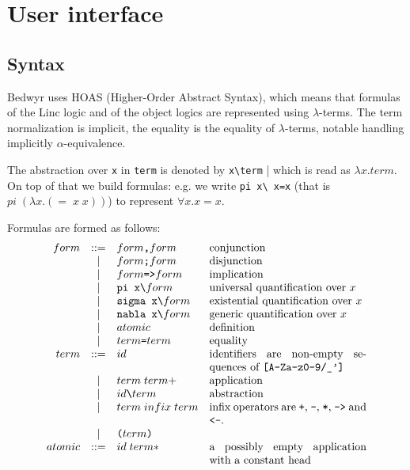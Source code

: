 \documentclass{article}
\begin{document}
\section{User interface}
\label{sec:interface}

\subsection{Syntax}

Bedwyr uses HOAS (Higher-Order Abstract Syntax), which means that formulas
of the Linc logic and of the object logics are represented using 
$\lambda$-terms. The term normalization is implicit, the equality is the 
equality of $\lambda$-terms, notable handling implicitly $\alpha$-equivalence.

The abstraction over \verb.x. in \verb.term. is denoted by \verb.x\term. | 
which is read as $\lambda x. term$. On top of that we build 
formulas: e.g. we write \verb.pi x\ x=x.
(that is $pi\;(\lambda{}x.(=\;x\;x))$)
to represent $\forall x. x=x$.

Formulas are formed as follows:
\[\begin{array}{rclp{5cm}}
form &::=& form \texttt{,}  form & conjunction \\
     & | & form \texttt{;}  form & disjunction \\
     & | & form \texttt{=>} form & implication \\
     & | & \verb.pi x\.    form  & universal quantification over $x$ \\
     & | & \verb.sigma x\. form  & existential quantification over $x$ \\
     & | & \verb.nabla x\. form  & generic quantification over $x$ \\
     & | & atomic & definition \\
     & | & term \verb.=. term & equality \\
term &::=& id & identifiers are non-empty sequences of \verb.[A-Za-z0-9/_']. \\
     & | & term \; term+ & application \\
     & | & id \verb.\. term & abstraction \\
     & | & term \; infix \; term & infix operators are
             \verb.+., \verb.-., \verb.*., \verb.->. and \verb.<-.. \\
     & | & \verb.(. term \verb.). & \\
atomic &::=& id \; term* & a possibly empty application with a constant head \\
\end{array}\]
\end{document}
